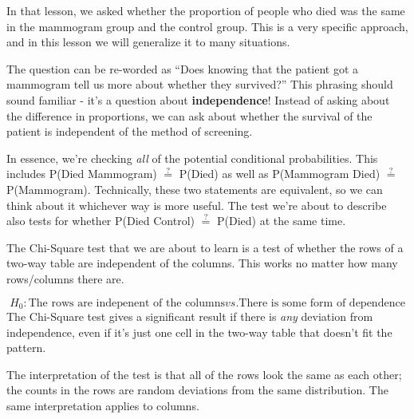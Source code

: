 \documentclass[
  letterpaper,
  DIV=11,
  numbers=noendperiod,
  oneside]{scrreprt}
\begin{document}
In that lesson, we asked whether the proportion of people who died was
the same in the mammogram group and the control group. This is a very
specific approach, and in this lesson we will generalize it to many
situations.

The question can be re-worded as ``Does knowing that the patient got a
mammogram tell us more about whether they survived?'' This phrasing
should sound familiar - it's a question about \textbf{independence}!
Instead of asking about the difference in proportions, we can ask about
whether the survival of the patient is independent of the method of
screening.

In essence, we're checking \emph{all} of the potential conditional
probabilities. This includes P(Died \textbar{} Mammogram)
\(\stackrel{?}{=}\) P(Died) as well as P(Mammogram \textbar{} Died)
\(\stackrel{?}{=}\) P(Mammogram). Technically, these two statements are
equivalent, so we can think about it whichever way is more useful. The
test we're about to describe also tests for whether P(Died \textbar{}
Control) \(\stackrel{?}{=}\) P(Died) at the same time.

\begin{tcolorbox}[enhanced jigsaw, toprule=.15mm, colbacktitle=quarto-callout-note-color!10!white, title=\textcolor{quarto-callout-note-color}{\faInfo}\hspace{0.5em}{Test for Independence of Columns and Rows}, arc=.35mm, colframe=quarto-callout-note-color-frame, colback=white, titlerule=0mm, left=2mm, bottomtitle=1mm, bottomrule=.15mm, breakable, opacitybacktitle=0.6, leftrule=.75mm, toptitle=1mm, coltitle=black, rightrule=.15mm, opacityback=0]

The Chi-Square test that we are about to learn is a test of whether the
rows of a two-way table are independent of the columns. This works no
matter how many rows/columns there are.

\[
H_0: \text{The rows are indepenent of the columns} vs. \text{There is some form of dependence}
\] The Chi-Square test gives a significant result if there is \emph{any}
deviation from independence, even if it's just one cell in the two-way
table that doesn't fit the pattern.

\end{tcolorbox}

The interpretation of the test is that all of the rows look the same as
each other; the counts in the rows are random deviations from the same
distribution. The same interpretation applies to columns.
\end{document}
